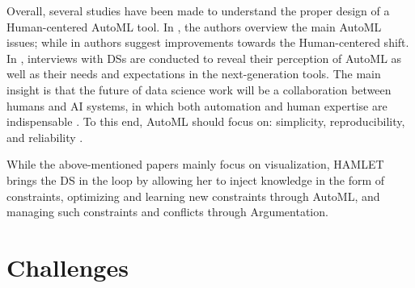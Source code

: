 Overall, several studies have been made to understand the proper design of a Human-centered AutoML tool.
In \cite{pfisterer2019towards}, the authors overview the main AutoML issues; while in \cite{khuat2022roles} authors suggest improvements towards the Human-centered shift.
In \cite{gil2019towards, XinWLSP21automationml, crisan2021fits}, interviews with DSs are conducted to reveal their perception of AutoML as well as their needs and expectations in the next-generation tools.
The main insight is that the future of data science work will be a collaboration between humans and AI systems, in which both automation and human expertise are indispensable \cite{wang2019human}.
To this end, AutoML should focus on: simplicity, reproducibility, and reliability \cite{XinWLSP21automationml, crisan2021fits}.

While the above-mentioned papers mainly focus on visualization, HAMLET brings the DS in the loop by allowing her to inject knowledge in the form of constraints, optimizing and learning new constraints through AutoML, and managing such constraints and conflicts through Argumentation.


\section{Challenges}




